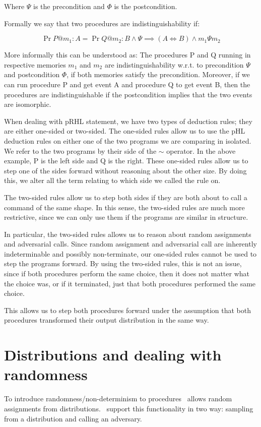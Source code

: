Where $\Psi$ is the precondition and $\Phi$ is the postcondition.

Formally we say that two procedures are indistinguishability if:

\[
  \Pr{P @ m_{1} : A} = \Pr{Q @ m_{2} : B} \land \Psi \implies (A \iff B) \land m_{1} \Psi m_{2}
\]

More informally this can be understood as: The procedures P and Q running in
respective memories $m_{1}$ and $m_{2}$ are indistinguishability w.r.t. to
precondition $\Psi$ and postcondition $\Phi$, if both memories satisfy the
precondition. Moreover, if we can run procedure P and get event A and
procedure Q to get event B, then the procedures are indistinguishable if the
postcondition implies that the two events are isomorphic.


When dealing with pRHL statement, we have two types of deduction rules; they are
either one-sided or two-sided.
The one-sided rules allow us to use the pHL deduction rules on either one of the
two programs we are comparing in isolated. We refer to the two programs by their
side of the $\sim$ operator. In the above example, P is the left side and Q is
the right.
These one-sided rules allow us to step one of the sides forward without
reasoning about the other size. By doing this, we alter all the term relating to
which side we called the rule on.

The two-sided rules allow us to step both sides if they are both about to call
a command of the same shape. In this sense, the two-sided rules are much more
restrictive, since we can only use them if the programs are similar in structure.

In particular, the two-sided rules allows us to reason about random assignments
and adversarial calls.
Since random assignment and adversarial call are inherently indeterminable and possibly
non-terminate, our one-sided rules cannot be used to step the programs forward.
By using the two-sided rules, this is not an issue,
since if both procedures perform the same choice, then it does not
matter what the choice was, or if it terminated, just that both procedures
performed the same choice.

This allows us to step both procedures forward under the assumption that both
procedures transformed their output distribution in the same way.

\section{Distributions and dealing with randomness}
\label{sec:easycrypt:distributions}
To introduce randomness/non-determinism to procedures \easycrypt\ allows
random assignments from distributions. \easycrypt\ support this functionality in
two way: sampling from a distribution and calling an adversary.


